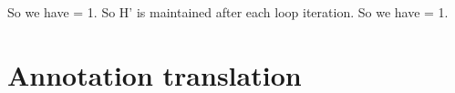 So we have  = 1.
So H' is maintained after each loop iteration.
So we have  = 1.


\section{Annotation translation}
\label{sec:annotation-translation}
